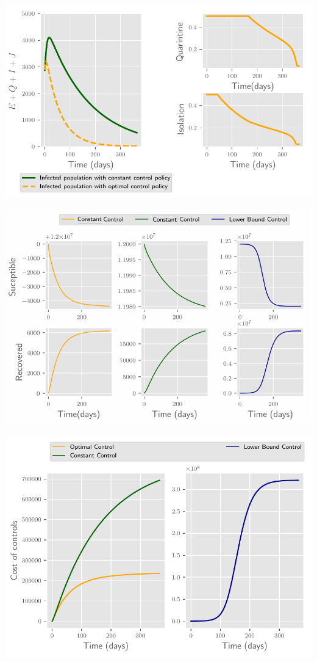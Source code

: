\begin{frame}{}
    \includegraphics[width=\linewidth]{figure_1_sars-eps-converted-to.pdf}
\end{frame}
\begin{frame}{}
\includegraphics[width=\linewidth]{figure_2_sars-eps-converted-to.pdf}
\end{frame}
\begin{frame}{}
\includegraphics[width=\linewidth]{figure_3_sars-eps-converted-to.pdf}
\end{frame}